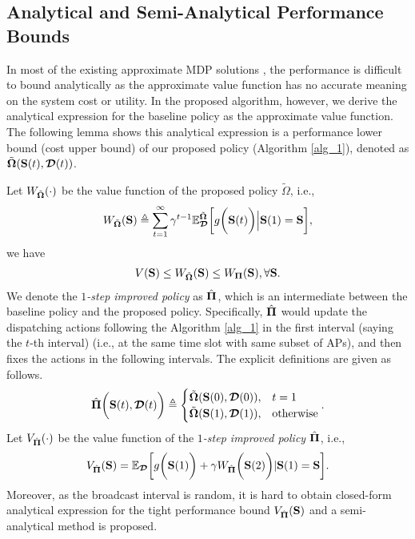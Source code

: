 \subsection{Analytical and Semi-Analytical Performance Bounds}
\label{subsec:chapter3-analysis}
In most of the existing approximate MDP solutions \cite{mdp-bound1,mdp-bound2,mdp-bound3}, the performance is difficult to bound analytically as the approximate value function has no accurate meaning on the system cost or utility.
In the proposed algorithm, however, we derive the analytical expression for the baseline policy as the approximate value function.
The following lemma shows this analytical expression is a performance lower bound (cost upper bound) of our proposed policy (Algorithm \ref{alg_1}), {denoted as $\tilde{\boldsymbol{\Omega}}(\mathbf{S}(t), \boldsymbol{\mathcal{D}}(t))$}.
\begin{lemma}
    \label{lemma:bound}
    Let $W_{\tilde{\boldsymbol{\Omega}}}(\cdot)$ be the value function of the proposed policy $\tilde{\Omega}$, i.e.,
    \begin{align}
        W_{\tilde{\boldsymbol{\Omega}}}(\mathbf{S}) \triangleq
        \sum_{t=1}^{\infty} \gamma^{t-1} \mathbb{E}^{\tilde{\boldsymbol{\Omega}}}_{\boldsymbol{\mathcal{D}}} \bigg[
            g\bigg(\mathbf{S}(t)\bigg) \Big| \mathbf{S}(1)=\mathbf{S}
        \bigg],
        \label{eqn:bound}
    \end{align}
    we have
    \begin{align}
        V(\mathbf{S})
        \leq W_{\tilde{\boldsymbol{\Omega}}}(\mathbf{S})
        \leq W_{\mathbf{\Pi}}(\mathbf{S}),
        \forall \mathbf{S}.
    \end{align}
    We denote the \emph{$1$-step improved policy} as $\hat{\mathbf{\Pi}}$, which is an intermediate between the baseline policy and the proposed policy. Specifically, $\hat{\mathbf{\Pi}}$ would update the dispatching actions following the Algorithm \ref{alg_1} in the first interval (saying the $t$-th interval) (i.e., at the same time slot with same subset of APs), and then fixes the actions in the following intervals. The explicit definitions are given as follows.
    \begin{align}
        \hat{\mathbf{\Pi}}\bigg(\mathbf{S}(t), \boldsymbol{\mathcal{D}}(t)\bigg) \triangleq 
        \begin{cases}
            \tilde{\boldsymbol{\Omega}}({\mathbf{S}(0), \boldsymbol{\mathcal{D}}(0)}), &t=1
            \\
            \tilde{\boldsymbol{\Omega}}({\mathbf{S}(1), \boldsymbol{\mathcal{D}}(1)}), &\text{otherwise}
        \end{cases}.
    \end{align}
    Let $V_{\hat{\mathbf{\Pi}}}(\cdot)$ be the value function of the \emph{$1$-step improved policy} $\hat{\mathbf{\Pi}}$, i.e.,
    \begin{align}
        V_{\hat{\mathbf{\Pi}}}(\mathbf{S}) = \mathbb{E}_{\boldsymbol{\mathcal{D}}}\bigg[ g\bigg(\mathbf{S}(1)\bigg) + \gamma W_{\hat{\mathbf{\Pi}}}\bigg(\mathbf{S}(2)\bigg) | \mathbf{S}(1)=\mathbf{S} \bigg].
    \end{align}
    Moreover, as the broadcast interval is random, it is hard to obtain closed-form analytical expression for the tight performance bound $V_{\hat{\mathbf{\Pi}}}(\mathbf{S})$ and a semi-analytical method is proposed.
\end{lemma}
